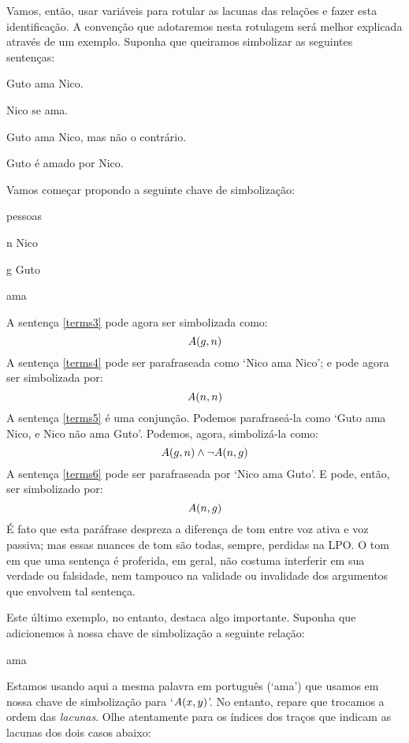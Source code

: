 Vamos, então, usar variáveis para rotular as lacunas das relações e fazer esta identificação.
A convenção que adotaremos nesta rotulagem será melhor explicada através de um exemplo.
Suponha que queiramos simbolizar as seguintes sentenças:
	\begin{earg}
		\item[\ex{terms3}] Guto ama Nico.
		\item[\ex{terms4}] Nico se ama.
		\item[\ex{terms5}] Guto ama Nico, mas não o contrário.
		\item[\ex{terms6}] Guto é amado por Nico.
	\end{earg}
Vamos começar propondo a seguinte chave de simbolização:
\begin{center}
	\begin{ekey}
		\item[\text{domínio}] pessoas
		\item[n] Nico
		\item[g] Guto
		\item[\atom{A}{x,y}]  ama 
	\end{ekey}
\end{center}
A sentença \ref{terms3} pode agora ser simbolizada como:
$$\mathord{A}(g,n)$$ 
A sentença \ref{terms4} pode ser parafraseada como `Nico ama Nico'; e pode agora ser simbolizada por: $$\mathord{A}(n,n)$$
A sentença \ref{terms5} é uma conjunção.
Podemos parafraseá-la como `Guto ama Nico, e Nico não ama Guto'.
Podemos, agora, simbolizá-la como:
$$\mathord{A}(g,n) \wedge \neg \mathord{A}(n,g)$$
A sentença \ref{terms6} pode ser parafraseada por `Nico ama Guto'.
E pode, então, ser simbolizado por:
$$\mathord{A}(n,g)$$
É fato que esta paráfrase despreza a diferença de tom entre voz ativa e voz passiva; mas essas nuances de tom são todas, sempre,  perdidas na LPO.
O tom em que uma sentença é proferida, em geral, não costuma interferir em sua verdade ou falsidade, nem tampouco na validade ou invalidade dos argumentos que envolvem tal sentença. 

Este último exemplo, no entanto, destaca algo importante.
Suponha que adicionemos à nossa chave de simbolização a seguinte relação:
\begin{center}
	\begin{ekey}
		\item[\atom{C}{x,y}]  ama \gap{x}
	\end{ekey}
\end{center}
Estamos usando aqui a mesma palavra em português (`ama') que usamos em nossa chave de simbolização para `$\mathord{A}(x,y)$'.
No entanto, repare que trocamos a ordem das \emph{lacunas}.
Olhe atentamente para os índices dos traços que indicam as lacunas dos dois casos abaixo:

